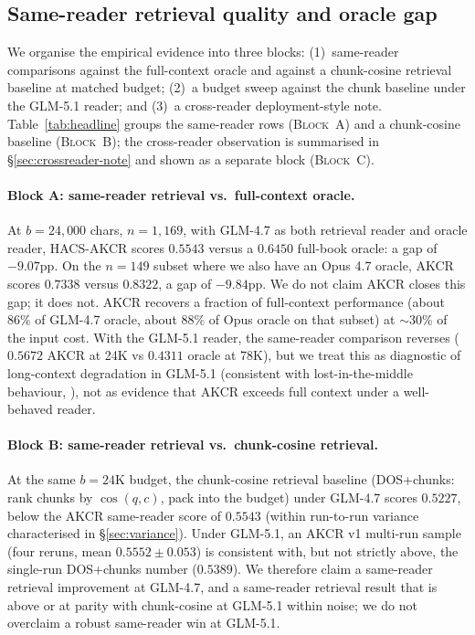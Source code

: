 \documentclass{article}
\theoremstyle{plain}
\theoremstyle{definition}
\theoremstyle{remark}
\begin{document}
\subsection{Same-reader retrieval quality and oracle gap}
\label{sec:headline}\label{sec:samereader}

We organise the empirical evidence into three blocks: (1)~same-reader
comparisons against the full-context oracle and against a chunk-cosine
retrieval baseline at matched budget; (2)~a budget sweep against the chunk
baseline under the GLM-5.1 reader; and (3)~a cross-reader deployment-style
note. Table~\ref{tab:headline} groups the same-reader rows
(\textsc{Block~A}) and a chunk-cosine baseline (\textsc{Block~B}); the
cross-reader observation is summarised in
\S\ref{sec:crossreader-note} and shown as a separate block
(\textsc{Block~C}).

\paragraph{Block A: same-reader retrieval vs.\ full-context oracle.}
At $b\!=\!24{,}000$ chars, $n\!=\!1{,}169$, with GLM-4.7 as both retrieval
reader and oracle reader, HACS-AKCR scores $0.5543$ versus a $0.6450$
full-book oracle: a gap of $-9.07$pp. On the $n\!=\!149$ subset where we
also have an Opus 4.7 oracle, AKCR scores $0.7338$ versus $0.8322$, a gap
of $-9.84$pp. We do not claim AKCR closes this gap; it does not. AKCR
recovers a fraction of full-context performance (about $86\%$ of GLM-4.7
oracle, about $88\%$ of Opus oracle on that subset) at $\sim$30\% of the
input cost. With the GLM-5.1 reader, the same-reader comparison reverses
($0.5672$ AKCR at 24K vs $0.4311$ oracle at 78K), but we treat this as
diagnostic of long-context degradation in GLM-5.1 (consistent with
lost-in-the-middle behaviour, \citealt{liu2024lostinmiddle}), not as
evidence that AKCR exceeds full context under a well-behaved reader.

\paragraph{Block B: same-reader retrieval vs.\ chunk-cosine retrieval.}
At the same $b\!=\!24$K budget, the chunk-cosine retrieval baseline
(DOS+chunks: rank chunks by $\cos(q,c)$, pack into the budget) under
GLM-4.7 scores $0.5227$, below the AKCR same-reader score of $0.5543$
(within run-to-run variance characterised in \S\ref{sec:variance}). Under
GLM-5.1, an AKCR v1 multi-run sample (four reruns, mean
$0.5552\!\pm\!0.053$) is consistent with, but not strictly above, the
single-run DOS+chunks number ($0.5389$). We therefore claim a same-reader
retrieval improvement at GLM-4.7, and a same-reader retrieval result that is
above or at parity with chunk-cosine at GLM-5.1 within noise; we do not
overclaim a robust same-reader win at GLM-5.1.
\end{document}
